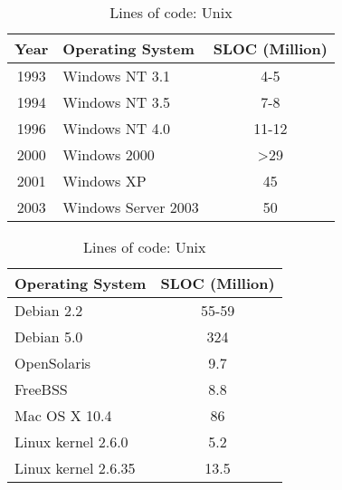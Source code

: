 
\begin{table}[ht]
\begin{minipage}[b]{0.5\linewidth}\centering
\begin{tabular}{clc}\hline
Year & Operating System & SLOC (Million)\\\hline
1993 & Windows NT 3.1 & 4-5\\
1994 & Windows NT 3.5 & 7-8\\
1996 & Windows NT 4.0 & 11-12\\
2000 & Windows 2000 & \textgreater29\\
2001 & Windows XP & 45\\
2003 & Windows Server 2003 & 50
\end{tabular}
\caption{Lines of code: Windows \cite{sloc}}
\label{tbl:sloc_win}
\end{minipage}
\hspace{0.5cm}
\begin{minipage}[b]{0.5\linewidth}\centering
\begin{tabular}{lc}\hline
Operating System & SLOC (Million)\\\hline
Debian 2.2 & 55-59\\
Debian 5.0 & 324\\
OpenSolaris & 9.7\\
FreeBSS & 8.8\\
Mac OS X 10.4 & 86\\
Linux kernel 2.6.0 & 5.2\\
Linux kernel 2.6.35 & 13.5
\end{tabular}
\caption{Lines of code: Unix \cite{sloc}}
\label{tbl:sloc_unix}
\end{minipage}
\end{table}